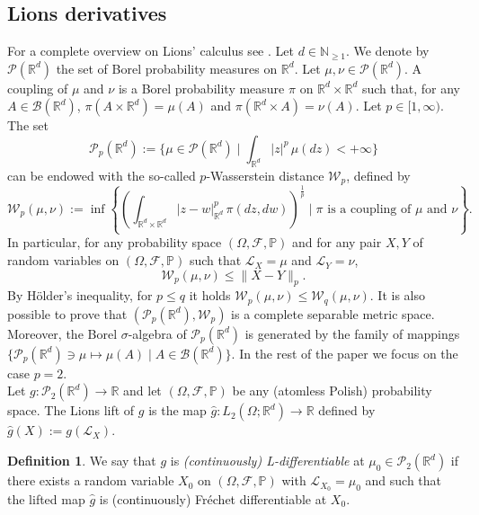 \documentclass[10pt, a4paper]{article} %
\newcommand{\R}{\mathbb{R}}
\theoremstyle{definition}
\newtheorem{defn}{Definition}[section]
\theoremstyle{plain}
\begin{document}
\subsection{Lions derivatives}
For a complete overview on Lions' calculus see \cite[Section 5]{CARMONADELARUE_volumeI}. 
Let $d \in \mathbb{N}_{\ge 1}$. We denote by $\mathcal{P}(\R^d)$ the set of Borel probability measures on $\R^d$.
Let $\mu,\nu \in \mathcal{P}(\R^d)$.
A coupling of $\mu$ and $\nu$ is a Borel probability measure $\pi$ on $\R^d \times \R^d$ such that, for any $A \in \mathcal{B}(\R^d)$, $\pi(A \times \R^d) = \mu(A)$ and $\pi(\R^d \times A) = \nu (A)$.  
Let $p \in [1,\infty)$. 
The set \begin{equation*}
    \mathcal{P}_p(\R^d) := \Big\{ \mu \in \mathcal{P}(\R^d) \mid \int_{\R^d} |z|^p \, \mu(dz) < +\infty \Big\}
\end{equation*}
can be endowed with the so-called $p$-Wasserstein distance $\mathcal{W}_p$, defined by \begin{equation*}
    \mathcal{W}_p(\mu,\nu) := \inf \left\{ \left(\int_{\R^d \times \R^d} |z-w|_{\R^d}^p \, \pi(dz,dw) \right)^\frac{1}{p} \mid \text{$\pi$ is a coupling of $\mu$ and $\nu$}  \right\} . 
\end{equation*} 
In particular, for any probability space $(\Omega,\mathcal{F},\mathbb{P})$ and for any pair $X,Y$ of random variables on $(\Omega,\mathcal{F},\mathbb{P})$ such that $\mathcal{L}_X = \mu$ and $\mathcal{L}_Y = \nu$, \begin{equation*}
    \mathcal{W}_p(\mu,\nu) \le \|X-Y\|_p .
\end{equation*}
\noindent By H\"older's inequality, for $p \le q$ it holds $\mathcal{W}_p(\mu,\nu) \le \mathcal{W}_q(\mu,\nu)$.  It is also possible to prove that $(\mathcal{P}_p(\R^d), \mathcal{W}_p)$ is a complete separable metric space. Moreover, the Borel $\sigma$-algebra of $\mathcal{P}_p(\R^d)$ is generated by the family of mappings $\{\mathcal{P}_p(\R^d) \ni \mu \mapsto \mu(A) \mid A \in \mathcal{B}(\R^d)\}$. In the rest of the paper we focus on the case $p=2$. \\


\noindent Let $g:\mathcal{P}_2(\R^d) \to \R$ and let $(\Omega,\mathcal{F},\mathbb{P})$ be any (atomless Polish) probability space. 
The Lions lift of $g$ is the map $\hat{g}: L_2(\Omega;\R^d) \to \R$ defined by $\hat{g}(X) := g(\mathcal{L}_X)$.
\begin{defn}
    We say that $g$ is \textit{(continuously) L-differentiable} at $\mu_0 \in \mathcal{P}_2(\R^d)$ if there exists a random variable $X_0$ on $(\Omega,\mathcal{F},\mathbb{P})$ with $\mathcal{L}_{X_0} = \mu_0$ and such that the lifted map $\hat{g}$ is (continuously) Fréchet differentiable at $X_0$.
\end{defn}
\end{document}
